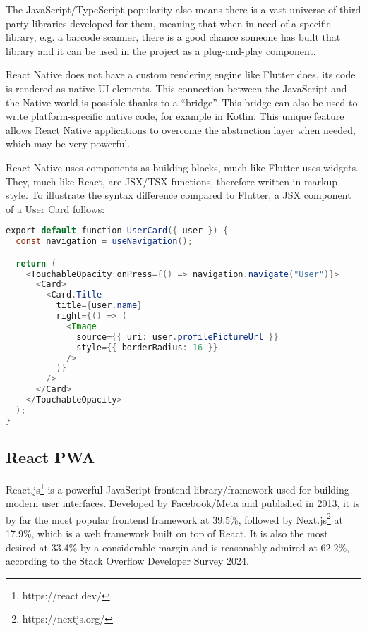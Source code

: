 \documentclass[
  digital,     %
  color,       %
  oneside,     %
  nosansbold,  %
  nocolorbold, %
  lof,         %
  lot,         %
]{fithesis4}
\begin{document}
The JavaScript/TypeScript popularity also means there is a vast universe of third party libraries developed for them, meaning that when in need of a specific library, e.g. a barcode scanner, there is a good chance someone has built that library and it can be used in the project as a plug-and-play component.

React Native does not have a custom rendering engine like Flutter does, its code is rendered as native UI elements. This connection between the JavaScript and the Native world is possible thanks to a ``bridge''\cite{ReactNative}. This bridge can also be used to write platform-specific native code, for example in Kotlin. This unique feature allows React Native applications to overcome the abstraction layer when needed, which may be very powerful.

React Native uses components as building blocks, much like Flutter uses widgets. They, much like React, are JSX/TSX functions, therefore written in markup style. To illustrate the syntax difference compared to Flutter, a JSX component of a User Card follows:

\begin{lstlisting}[language=java, caption={React Native example --- User Card}]
export default function UserCard({ user }) {
  const navigation = useNavigation();

  return (
    <TouchableOpacity onPress={() => navigation.navigate("User")}>
      <Card>
        <Card.Title
          title={user.name}
          right={() => (
            <Image
              source={{ uri: user.profilePictureUrl }}
              style={{ borderRadius: 16 }}
            />
          )}
        />
      </Card>
    </TouchableOpacity>
  );
}
\end{lstlisting}

\subsection{React PWA}
React.js\footnote{https://react.dev/} is a powerful JavaScript frontend library/framework used for building modern user interfaces. Developed by Facebook/Meta and published in 2013\cite{ReactVersions}, it is by far the most popular frontend framework at 39.5\%, followed by Next.js\footnote{https://nextjs.org/} at 17.9\%, which is a web framework built on top of React. It is also the most desired at 33.4\% by a considerable margin and is reasonably admired at 62.2\%, according to the Stack Overflow Developer Survey 2024\cite{StackOverflow2024}. 
\end{document}

